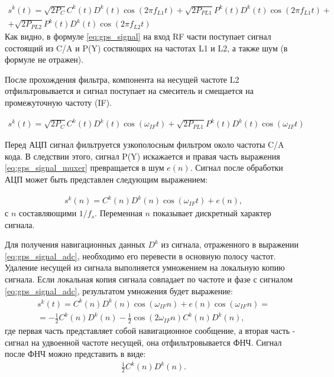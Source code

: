 \begin{eqnarray}
s^k(t) =	\sqrt{2P_C} C^k(t) D^k(t) \cos(2 \pi f_{L1} t) +
		\sqrt{2P_{PL1}} P^k(t) D^k(t) \cos(2 \pi f_{L1} t) + \nonumber \\
		+ \sqrt{2P_{PL2}} P^k(t) D^k(t) \cos(2 \pi f_{L2} t)
\label{eq:gps_signal}
\end{eqnarray}
Как видно, в формуле \ref{eq:gps_signal} на вход RF части поступает сигнал состоящий из C/A и P(Y) 
соствляющих на частотах L1 и L2, а также шум (в формуле не отражен).

После прохождения фильтра, компонента на несущей частоте L2 отфильтровывается и сигнал поступает на смеситель и смещается на
промежуточную частоту (IF).

\begin{eqnarray}
s^k(t) =	\sqrt{2P_C} C^k(t) D^k(t) \cos(\omega_{IF} t) +
		\sqrt{2P_{PL1}} P^k(t) D^k(t) \cos(\omega_{IF} t)
\label{eq:gps_signal_muxer}
\end{eqnarray}

Перед АЦП сигнал фильтруется узкополосным фильтром около частоты C/A кода. В следствии этого, сигнал P(Y) искажается и правая часть
выражения \ref{eq:gps_signal_muxer} превращается в шум ${e(n)}$. Сигнал после обработки АЦП может быть представлен следующим
выражением:

\begin{eqnarray}
s^k(n) =	C^k(n) D^k(n) \cos(\omega_{IF} t) + e(n),
\label{eq:gps_signal_adc}
\end{eqnarray}
с ${n}$ составляющими ${1/f_s}$. Переменная ${n}$ показывает дискретный характер сигнала.

Для получения навигационных данных ${D^k}$ из сигнала, отраженного в выражении \ref{eq:gps_signal_adc}, необходимо его 
перевести в основную полосу частот. Удаление несущей из сигнала выполняется умножением на локальную копию сигнала.
Если локальная копия сигнала совпадает по частоте и фазе с сигналом \ref{eq:gps_signal_adc}, результатом умножения 
будет выражение:
\begin{eqnarray}
s^k(t)	=	C^k(n) D^k(n) \cos(\omega_{IF} n) + e(n) \cos(\omega_{IF} n) = \nonumber \\
	=	-\frac{1}{2}C^k(n) D^k(n) - \frac{1}{2}\cos(2\omega_{IF} n)C^k(n) D^k(n),
\label{eq:gps_signal_lpf}
\end{eqnarray}
где первая часть представляет собой навигационное сообщение, а вторая часть - сигнал на удвоенной частоте несущей, она
отфильтровывается ФНЧ. Сигнал после ФНЧ можно представить в виде:
\begin{eqnarray}
\frac{1}{2}C^k(n) D^k(n).
\end{eqnarray}

